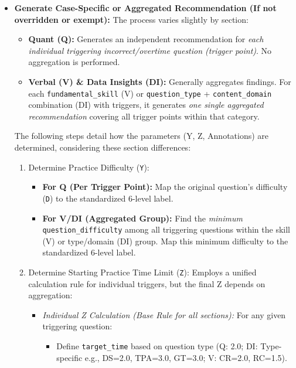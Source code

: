 \documentclass{article}
\begin{document}
\begin{enumerate}
\begin{itemize}
        \item \textbf{Generate Case-Specific or Aggregated Recommendation (If not overridden or exempt):} The process varies slightly by section:
            \begin{itemize}
                \item \textbf{Quant (Q):} Generates an independent recommendation for \textit{each individual triggering incorrect/overtime question (trigger point)}. No aggregation is performed.
                \item \textbf{Verbal (V) & Data Insights (DI):} Generally aggregates findings. For each \texttt{fundamental\_skill} (V) or \texttt{question\_type} + \texttt{content\_domain} combination (DI) with triggers, it generates \textit{one single aggregated recommendation} covering all trigger points within that category.
            \end{itemize}
            The following steps detail how the parameters (Y, Z, Annotations) are determined, considering these section differences:
            \begin{enumerate}
                \item Determine Practice Difficulty (\texttt{Y}):
                    \begin{itemize}
                        \item \textbf{For Q (Per Trigger Point):} Map the original question's difficulty (\texttt{D}) to the standardized 6-level label.
                        \item \textbf{For V/DI (Aggregated Group):} Find the \textit{minimum} \texttt{question\_difficulty} among all triggering questions within the skill (V) or type/domain (DI) group. Map this minimum difficulty to the standardized 6-level label.
                    \end{itemize}
                \item Determine Starting Practice Time Limit (\texttt{Z}): Employs a unified calculation rule for individual triggers, but the final Z depends on aggregation:
                    \begin{itemize}
                        \item \textit{Individual Z Calculation (Base Rule for all sections):} For any given triggering question:
                            \begin{itemize}
                                \item Define \texttt{target\_time} based on question type (Q: 2.0; DI: Type-specific e.g., DS=2.0, TPA=3.0, GT=3.0; V: CR=2.0, RC=1.5).

\end{itemize}
\end{itemize}
\end{enumerate}
\end{itemize}
\end{enumerate}
\end{document}
